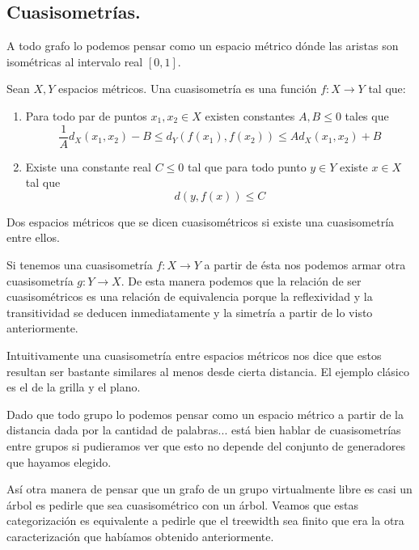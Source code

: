 \documentclass[tesis.tex]{subfiles}
\begin{document}
\subsection{Cuasisometrías.}
A todo grafo lo podemos pensar como un espacio métrico dónde las aristas son isométricas al intervalo real $[0,1]$. 


\begin{deff}
	Sean $X,Y$ espacios métricos. Una cuasisometría es una función $f:X \to Y$ tal que:
	\begin{enumerate}
	\item Para todo par de puntos $x_1,x_2 \in X$ existen constantes $A,B \le 0$ tales que
	\[
	\frac{1}{A} d_X(x_1,x_2) - B \le d_Y(f(x_1),f(x_2)) \le A d_X(x_1,x_2) + B
	\]
	\item Existe una constante real $C \le 0$ tal que para todo punto $y \in Y$ existe $x \in X$ tal que 
	\[
	d(y,f(x)) \le C
	\]
	\end{enumerate}
 	Dos espacios métricos que se dicen cuasisométricos si existe una cuasisometría entre ellos.
\end{deff}



Si tenemos una cuasisometría $f:X \to Y$ a partir de ésta nos podemos armar otra cuasisometría $g:Y \to X$. De esta manera podemos que la relación de ser cuasisométricos es una relación de equivalencia porque la reflexividad y la transitividad se deducen inmediatamente y la simetría a partir de lo visto anteriormente.


Intuitivamente una cuasisometría entre espacios métricos nos dice que estos resultan ser bastante similares al menos desde cierta distancia. El ejemplo clásico es el de la grilla y el plano.

Dado que todo grupo lo podemos pensar como un espacio métrico a partir de la distancia dada por la cantidad de palabras... está bien hablar de cuasisometrías entre grupos si pudieramos ver que esto no depende del conjunto de generadores que hayamos elegido.



Así otra manera de pensar que un grafo de un grupo virtualmente libre es casi un árbol es pedirle que sea cuasisométrico con un árbol. Veamos que estas categorización es equivalente a pedirle que el treewidth sea finito que era la otra caracterización que habíamos obtenido anteriormente.
\end{document}
